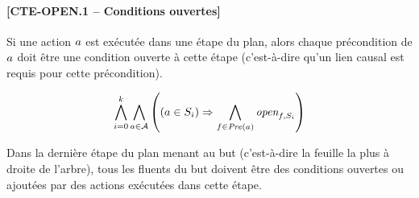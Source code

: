 
\paragraph*{[CTE-OPEN.1 -- Conditions ouvertes]}
Si une action $a$ est exécutée dans une étape du plan, alors chaque précondition de $a$ doit être une condition ouverte à cette étape (c'est-à-dire qu'un lien causal est requis pour cette précondition).

\begin{small}
\[ \bigwedge\limits_{\substack{i=0}}^{k} \bigwedge\limits_{\substack{a \in \mathcal{A}}} \left((a \in S_{i}) \Rightarrow \bigwedge\limits_{\substack{f\in \mathit{Pre}(a)}} \textit{open}_{f,S_{i}}\right) \]
\end{small}

Dans la dernière étape du plan menant au but (c'est-à-dire la feuille la plus à droite de l'arbre), tous les fluents du but doivent être des conditions ouvertes ou ajoutées par des actions exécutées dans cette étape.

